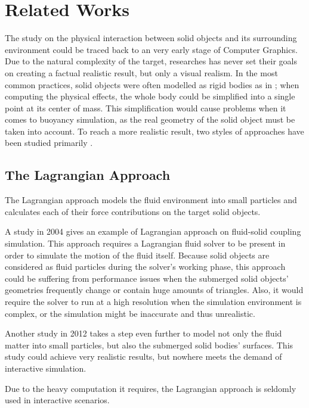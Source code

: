 \section{Related Works}

The study on the physical interaction between solid objects and its surrounding environment could be traced back to an very early stage of Computer Graphics.
Due to the natural complexity of the target, researches has never set their goals on creating a factual realistic result, but only a visual realism.
In the most common practices, solid objects were often modelled as rigid bodies as in \cite{BAR01}; when computing the physical effects, the whole body could be simplified into a single point at its center of mass.
This simplification would cause problems when it comes to buoyancy simulation, as the real geometry of the solid object must be taken into account.
To reach a more realistic result, two styles of approaches have been studied primarily \cite{GOU09}.

\subsection{The Lagrangian Approach}

The Lagrangian approach models the fluid environment into small particles and calculates each of their force contributions on the target solid objects.

A study in 2004 \cite{CAR04} gives an example of Lagrangian approach on fluid-solid coupling simulation.
This approach requires a Lagrangian fluid solver to be present in order to simulate the motion of the fluid itself.
Because solid objects are considered as fluid particles during the solver's working phase, this approach could be suffering from performance issues when the submerged solid objects' geometries frequently change or contain huge amounts of triangles.
Also, it would require the solver to run at a high resolution when the simulation environment is complex, or the simulation might be inaccurate and thus unrealistic.

Another study in 2012 \cite{AKI12} takes a step even further to model not only the fluid matter into small particles, but also the submerged solid bodies' surfaces.
This study could achieve very realistic results, but nowhere meets the demand of interactive simulation.

Due to the heavy computation it requires, the Lagrangian approach is seldomly used in interactive scenarios.

